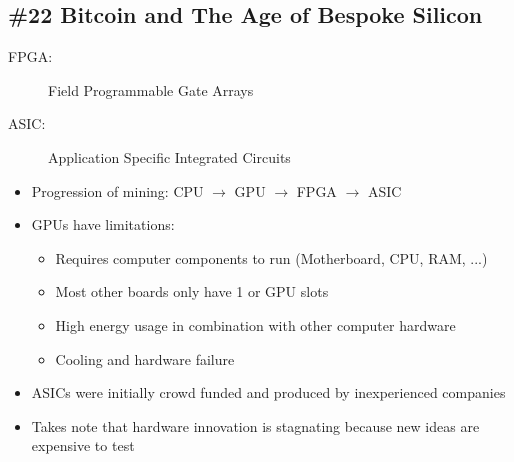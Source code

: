 \subsection*{\#22 Bitcoin and The Age of Bespoke Silicon}
\begin{description}
	\item[FPGA:] Field Programmable Gate Arrays
	\item[ASIC:] Application Specific Integrated Circuits
\end{description}
\begin{itemize}
	\item Progression of mining: CPU $\rightarrow$ GPU $\rightarrow$ FPGA $\rightarrow$ ASIC
	\item GPUs have limitations:
	\begin{itemize}
		\item Requires computer components to run (Motherboard, CPU, RAM, ...)
		\item Most other boards only have 1 or GPU slots
		\item High energy usage in combination with other computer hardware
		\item Cooling and hardware failure
	\end{itemize}
	\item ASICs were initially crowd funded and produced by inexperienced companies
	\item Takes note that hardware innovation is stagnating because new ideas are expensive to test
\end{itemize}